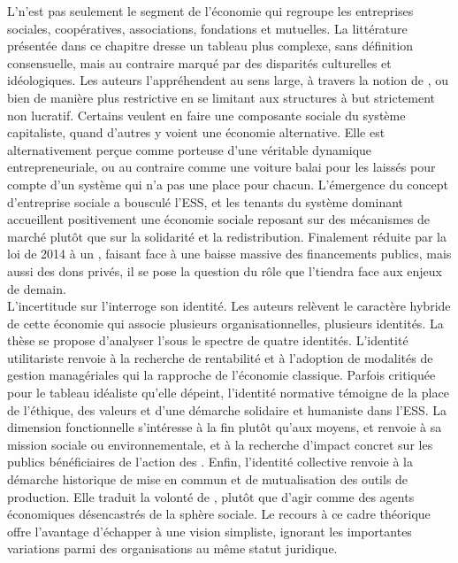 L'\ess n'est pas seulement le segment de l'économie qui regroupe les entreprises sociales, coopératives, associations, fondations et mutuelles. La littérature présentée dans ce chapitre dresse un tableau plus complexe, sans définition consensuelle, mais au contraire marqué par des disparités culturelles et idéologiques. Les auteurs l'appréhendent au sens large, à travers la notion de , ou bien de manière plus restrictive en se limitant aux structures à but strictement non lucratif. Certains veulent en faire une composante sociale du système capitaliste, quand d'autres y voient une économie alternative. Elle est alternativement perçue comme porteuse d'une véritable dynamique entrepreneuriale, ou au contraire comme une voiture balai pour les laissés pour compte d'un système qui n'a pas une place pour chacun. L'émergence du concept d'entreprise sociale a bousculé l'ESS, et les tenants du système dominant accueillent positivement une économie sociale reposant sur des mécanismes de marché plutôt que sur la solidarité et la redistribution. Finalement réduite par la loi de 2014 à un , faisant face à une baisse massive des financements publics, mais aussi des dons privés, il se pose la question du rôle que l'\ess tiendra face aux enjeux de demain. \\

L'incertitude sur l'\ess interroge son identité. Les auteurs relèvent le caractère hybride de cette économie qui associe plusieurs  organisationnelles, plusieurs identités. La thèse se propose d'analyser l'\ess sous le spectre de quatre identités. L'identité utilitariste renvoie à la recherche de rentabilité et à l'adoption de modalités de gestion managériales qui la rapproche de l'économie classique. Parfois critiquée pour le tableau idéaliste qu'elle dépeint, l'identité normative témoigne de la place de l'éthique, des valeurs et d'une démarche solidaire et humaniste dans l'ESS. La dimension fonctionnelle s'intéresse à la fin plutôt qu'aux moyens, et renvoie à sa mission sociale ou environnementale, et à la recherche d'impact concret sur les publics bénéficiaires de l'action des \oess. Enfin, l'identité collective renvoie à la démarche historique de mise en commun et de mutualisation des outils de production. Elle traduit la volonté de , plutôt que d'agir comme des agents économiques désencastrés de la sphère sociale. Le recours à ce cadre théorique offre l'avantage d'échapper à une vision simpliste, ignorant les importantes variations parmi des organisations au même statut juridique. \\
